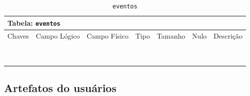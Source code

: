 \documentclass[12pt,a4paper]{article}
\begin{document}
\begin{center}
\begin{table}[h!]
	\caption{\texttt{eventos}}
	\label{tabela:eventos}
	\begin{tabular}{|p{1cm}|p{1.5cm}|p{1.25cm}|p{1.25cm}|p{1.75cm}|p{1.25cm}|p{4.5cm}|}\hline	
		\multicolumn{7}{|p{16cm}|}{\cellcolor{cinzaClaro}  \centering Tabela: \texttt{eventos}} \\ \hline %
		{\small Chaves} & {\small Campo Lógico} & {\small Campo Físico} & {\small Tipo} & {\small Tamanho} & {\small Nulo} & {\small Descrição}\\\hline %
		
		{\tiny } & {\tiny } & {\tiny } & {\tiny } & {\tiny } & {\tiny } &{\tiny }\\\hline
		{\tiny } & {\tiny } & {\tiny } & {\tiny } & {\tiny } & {\tiny } &{\tiny }\\\hline
		{\tiny } & {\tiny } & {\tiny } & {\tiny } & {\tiny } & {\tiny } &{\tiny }\\\hline
		{\tiny } & {\tiny } & {\tiny } & {\tiny } & {\tiny } & {\tiny } &{\tiny }\\\hline
		{\tiny } & {\tiny } & {\tiny } & {\tiny } & {\tiny } & {\tiny } &{\tiny }\\\hline
		{\tiny } & {\tiny } & {\tiny } & {\tiny } & {\tiny } & {\tiny } &{\tiny }\\\hline
		{\tiny } & {\tiny } & {\tiny } & {\tiny } & {\tiny } & {\tiny } &{\tiny }\\\hline
		{\tiny } & {\tiny } & {\tiny } & {\tiny } & {\tiny } & {\tiny } &{\tiny }\\\hline
		{\tiny } & {\tiny } & {\tiny } & {\tiny } & {\tiny } & {\tiny } &{\tiny }\\\hline
		
			
	\end{tabular}
\end{table}	
\end{center}

\subsection{Artefatos do usuários}
\end{document}
